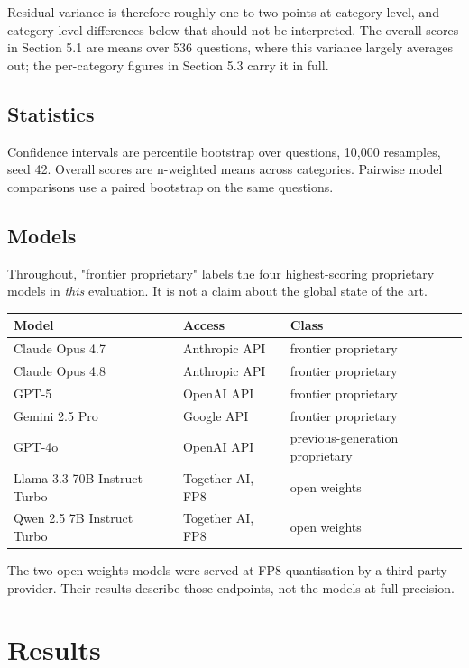 \documentclass[11pt,a4paper]{article}
\begin{document}
Residual variance is therefore roughly one to two points at category level, and category-level differences below that should not be interpreted. The overall scores in Section 5.1 are means over 536 questions, where this variance largely averages out; the per-category figures in Section 5.3 carry it in full.

\subsection{Statistics}

Confidence intervals are percentile bootstrap over questions, 10,000 resamples, seed 42. Overall scores are n-weighted means across categories. Pairwise model comparisons use a paired bootstrap on the same questions.

\subsection{Models}

Throughout, "frontier proprietary" labels the four highest-scoring proprietary models in \emph{this} evaluation. It is not a claim about the global state of the art.

\begin{center}
\begin{tabular}{lll}
\toprule
Model & Access & Class \\
\midrule
Claude Opus 4.7 & Anthropic API & frontier proprietary \\
Claude Opus 4.8 & Anthropic API & frontier proprietary \\
GPT-5 & OpenAI API & frontier proprietary \\
Gemini 2.5 Pro & Google API & frontier proprietary \\
GPT-4o & OpenAI API & previous-generation proprietary \\
Llama 3.3 70B Instruct Turbo & Together AI, FP8 & open weights \\
Qwen 2.5 7B Instruct Turbo & Together AI, FP8 & open weights \\
\bottomrule
\end{tabular}
\end{center}

The two open-weights models were served at FP8 quantisation by a third-party provider. Their results describe those endpoints, not the models at full precision.


\section{Results}
\end{document}
